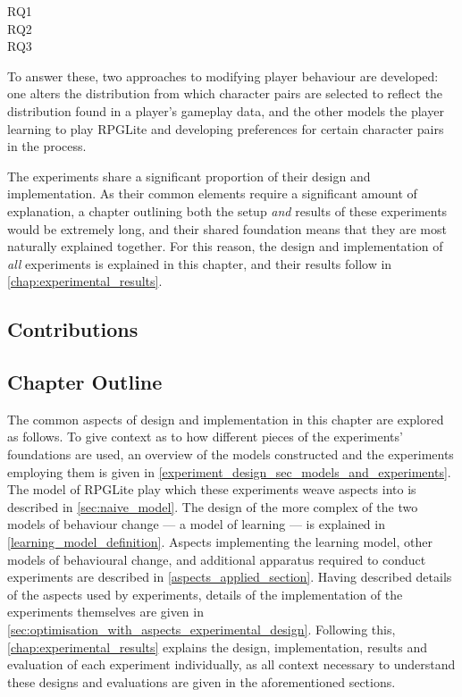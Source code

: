 \begin{researchquestion}
  \begin{description}
   \item[RQ1] \rqone{}
   \item[RQ2] \rqtwo{}
   \item[RQ3] \rqthree{}
  \end{description}
\end{researchquestion}

To answer these, two approaches to modifying player behaviour are developed:
one alters the distribution from which character pairs are selected to reflect
the distribution found in a player's gameplay data, 
and the other models the player learning to play RPGLite and developing
preferences for certain character pairs in the process.

The experiments share a significant proportion of their design and
implementation. As their common elements require a significant amount of
explanation, a chapter outlining both the setup \emph{and} results of these
experiments would be extremely long, and their shared foundation means that they
are most naturally explained together. For this reason, the design and
implementation of \emph{all} experiments is explained in this chapter, and their
results follow in \cref{chap:experimental_results}.

\subsection{Contributions}




\subsection{Chapter Outline}

The common aspects of design and implementation in this chapter are explored as
follows. To give context as to how different pieces of the experiments'
foundations are used, an overview of the models constructed and the experiments
employing them is given in \cref{experiment_design_sec_models_and_experiments}.
The model of RPGLite play which these experiments weave aspects into is
described in \cref{sec:naive_model}. The design of the more complex of the two
models of behaviour change --- a model of learning --- is explained in
\cref{learning_model_definition}. Aspects implementing the learning model, other
models of behavioural change, and additional apparatus required to conduct
experiments are described in \cref{aspects_applied_section}. Having described
details of the aspects used by experiments, details of the implementation of the
experiments themselves are given in
\cref{sec:optimisation_with_aspects_experimental_design}. Following this,
\cref{chap:experimental_results} explains the design, implementation, results
and evaluation of each experiment individually, as all context necessary to
understand these designs and evaluations are given in the aforementioned
sections.

